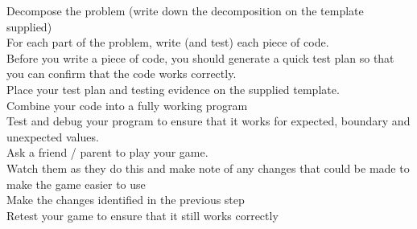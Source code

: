 \documentclass[a4paper,12pt]{article}
\begin{document}
Decompose the problem (write down the decomposition on the template supplied)\\
For each part of the problem, write (and test) each piece of code.  \\
Before you write a piece of code, you should generate a quick test plan so that you can confirm that the code works correctly. \\
Place your test plan and testing evidence on the supplied template.\\
Combine your code into a fully working program\\
Test and debug your program to ensure that it works for expected, boundary and unexpected values.\\
Ask a friend / parent to play your game.  \\
Watch them as they do this and make note of any changes that could be made to make the game easier to use\\
Make the changes identified in the previous step\\
Retest your game to ensure that it still works correctly\\
\end{document}
